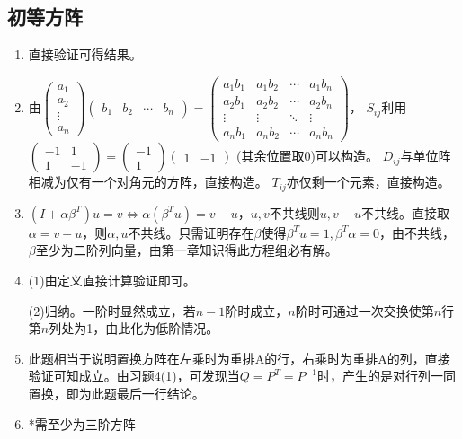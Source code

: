 \documentclass[a4paper,UTF8,fontset=windows]{ctexart}
\begin{document}
\subsection{初等方阵}
\begin{enumerate}
\item 
直接验证可得结果。

\item
由$\begin{pmatrix}a_1\\a_2\\\vdots\\a_n\end{pmatrix}\begin{pmatrix}b_1&b_2&\cdots&b_n\end{pmatrix}=\begin{pmatrix}a_1b_1&a_1b_2&\cdots&a_1b_n\\a_2b_1&a_2b_2&\cdots&a_2b_n\\\vdots&\vdots&\ddots&\vdots\\a_nb_1&a_nb_2&\cdots&a_nb_n\end{pmatrix}$，
$S_{ij}$利用$\begin{pmatrix}-1&1\\1&-1\end{pmatrix}=\begin{pmatrix}-1\\1\end{pmatrix}\begin{pmatrix}1&-1\end{pmatrix}$ (其余位置取0)可以构造。
$D_{ij}$与单位阵相减为仅有一个对角元的方阵，直接构造。
$T_{ij}$亦仅剩一个元素，直接构造。

\item
$(I+\alpha\beta^T)u=v\Leftrightarrow\alpha(\beta^Tu)=v-u$，$u,v$不共线则$u,v-u$不共线。直接取$\alpha=v-u$，则$\alpha,u$不共线。只需证明存在$\beta$使得$\beta^Tu=1,\beta^T\alpha=0$，由不共线，$\beta$至少为二阶列向量，由第一章知识得此方程组必有解。

\item
(1)由定义直接计算验证即可。

(2)归纳。一阶时显然成立，若$n-1$阶时成立，$n$阶时可通过一次交换使第$n$行第$n$列处为1，由此化为低阶情况。

\item
此题相当于说明置换方阵在左乘时为重排A的行，右乘时为重排A的列，直接验证可知成立。由习题4(1)，可发现当$Q=P^T=P^{-1}$时，产生的是对行列一同置换，即为此题最后一行结论。

\item
*需至少为三阶方阵


\end{enumerate}
\end{document}
